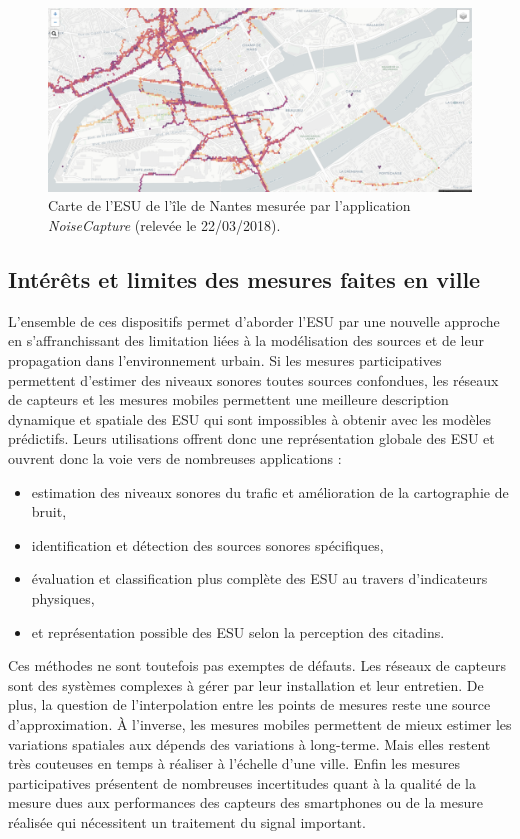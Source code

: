 \begin{figure}[t]
\centering
\includegraphics[width=0.7\linewidth]{./figures/cartographie/noise_modelling.PNG}
\caption{Carte de l'ESU de l'île de Nantes mesurée par l'application \textit{NoiseCapture}  (relevée le 22/03/2018).}
\label{fig:carte_noiseModelling}
\end{figure}

\subsection{Intérêts et limites des mesures faites en ville}

L'ensemble de ces dispositifs permet d'aborder l'ESU par une nouvelle approche en s'affranchissant des limitation liées à la modélisation des sources et de leur propagation dans l'environnement urbain. 
Si les mesures participatives permettent d'estimer des niveaux sonores toutes sources confondues, les réseaux de capteurs et les mesures mobiles permettent une meilleure description dynamique et spatiale des ESU qui sont impossibles à obtenir avec les modèles prédictifs. Leurs utilisations offrent donc une représentation globale des ESU et ouvrent donc la voie vers de nombreuses applications :

\begin{itemize}
\item estimation des niveaux sonores du trafic et amélioration de la cartographie de bruit,
\item identification et détection des sources sonores spécifiques, 
\item évaluation et classification plus complète des ESU au travers d'indicateurs physiques,
\item et représentation possible des ESU selon la perception des citadins.
\end{itemize}

Ces méthodes ne sont toutefois pas exemptes de défauts.
Les réseaux de capteurs sont des systèmes complexes à gérer par leur installation et leur entretien. De plus, la question de l'interpolation entre les points de mesures reste une source d'approximation.
À l'inverse, les mesures mobiles permettent de mieux estimer les variations spatiales aux dépends des variations à long-terme. Mais elles restent très couteuses en temps à réaliser à l'échelle d'une ville. Enfin les mesures participatives présentent de nombreuses incertitudes quant à la qualité de la mesure dues aux performances des capteurs des smartphones ou de la mesure réalisée qui nécessitent un traitement du signal important.


